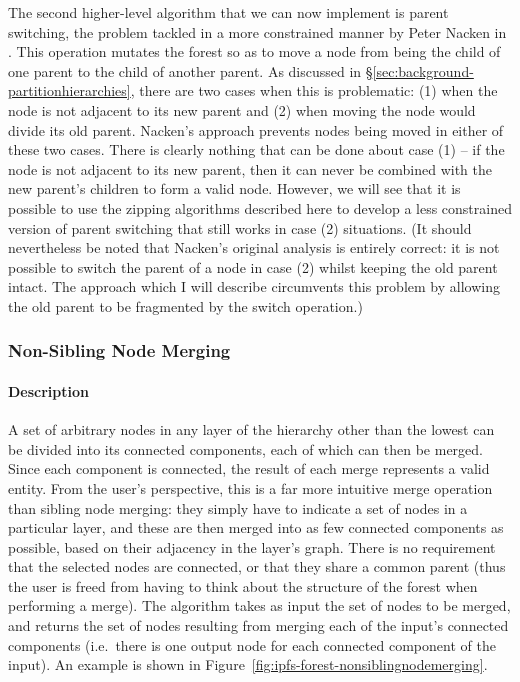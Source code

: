 The second higher-level algorithm that we can now implement is parent switching, the problem tackled in a more constrained manner by Peter Nacken in \cite{nacken95}. This operation mutates the forest so as to move a node from being the child of one parent to the child of another parent. As discussed in \S\ref{sec:background-partitionhierarchies}, there are two cases when this is problematic: (1) when the node is not adjacent to its new parent and (2) when moving the node would divide its old parent. Nacken's approach prevents nodes being moved in either of these two cases. There is clearly nothing that can be done about case (1) -- if the node is not adjacent to its new parent, then it can never be combined with the new parent's children to form a valid node. However, we will see that it is possible to use the zipping algorithms described here to develop a less constrained version of parent switching that still works in case (2) situations. (It should nevertheless be noted that Nacken's original analysis is entirely correct: it is not possible to switch the parent of a node in case (2) whilst keeping the old parent intact. The approach which I will describe circumvents this problem by allowing the old parent to be fragmented by the switch operation.)

\newpage

\subsubsection{Non-Sibling Node Merging}


\paragraph{Description}

A set of arbitrary nodes in any layer of the hierarchy other than the lowest can be divided into its connected components, each of which can then be merged. Since each component is connected, the result of each merge represents a valid entity. From the user's perspective, this is a far more intuitive merge operation than sibling node merging: they simply have to indicate a set of nodes in a particular layer, and these are then merged into as few connected components as possible, based on their adjacency in the layer's graph. There is no requirement that the selected nodes are connected, or that they share a common parent (thus the user is freed from having to think about the structure of the forest when performing a merge). The algorithm takes as input the set of nodes to be merged, and returns the set of nodes resulting from merging each of the input's connected components (i.e.~there is one output node for each connected component of the input). An example is shown in Figure~\ref{fig:ipfs-forest-nonsiblingnodemerging}.

